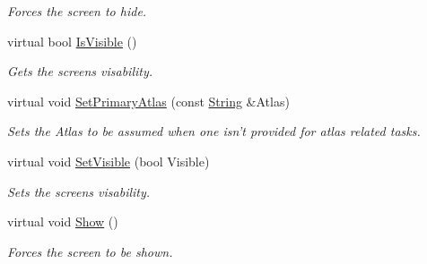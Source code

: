 \begin{DoxyCompactItemize}
\begin{DoxyCompactList}\small\item\em Forces the screen to hide. \item\end{DoxyCompactList}\item 
virtual bool \hyperlink{classMezzanine_1_1UI_1_1Screen_abe4941cec0c43850bafa4b76397944ae}{IsVisible} ()
\begin{DoxyCompactList}\small\item\em Gets the screens visability. \item\end{DoxyCompactList}\item 
virtual void \hyperlink{classMezzanine_1_1UI_1_1Screen_ae19e1d289996d93af69ff1ee500be2ad}{SetPrimaryAtlas} (const \hyperlink{namespaceMezzanine_acf9fcc130e6ebf08e3d8491aebcf1c86}{String} \&Atlas)
\begin{DoxyCompactList}\small\item\em Sets the Atlas to be assumed when one isn't provided for atlas related tasks. \item\end{DoxyCompactList}\item 
virtual void \hyperlink{classMezzanine_1_1UI_1_1Screen_a32ac3cc1bdfd2799b5bfef7f904b322d}{SetVisible} (bool Visible)
\begin{DoxyCompactList}\small\item\em Sets the screens visability. \item\end{DoxyCompactList}\item 
\hypertarget{classMezzanine_1_1UI_1_1Screen_a6d77c9fd4e2da65ed85f13b0bb7eebe4}{
virtual void \hyperlink{classMezzanine_1_1UI_1_1Screen_a6d77c9fd4e2da65ed85f13b0bb7eebe4}{Show} ()}
\label{classMezzanine_1_1UI_1_1Screen_a6d77c9fd4e2da65ed85f13b0bb7eebe4}

\begin{DoxyCompactList}\small\item\em Forces the screen to be shown. \item\end{DoxyCompactList}\end{DoxyCompactItemize}
